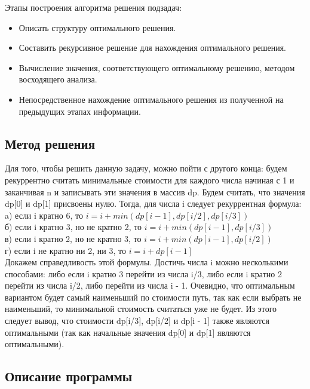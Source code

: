 \documentclass[12pt]{article}
\begin{document}
\noindent Этапы построения алгоритма решения подзадач:
\begin{itemize}
\item  Описать структуру оптимального решения.
\item Составить рекурсивное решение для нахождения оптимального решения.
\item 	Вычисление значения, соответствующего оптимальному решению, методом восходящего анализа.
\item 	Непосредственное нахождение оптимального решения из полученной на предыдущих этапах информации.
	
\end{itemize}

\subsection*{Метод решения}

Для того, чтобы решить данную задачу, можно пойти с другого конца: будем рекуррентно считать минимальные стоимости для каждого числа начиная с 1 и заканчивая n и записывать эти значения в массив dp. Будем считать, что значения dp[0] и dp[1] присвоены нулю. Тогда, для числа i следует рекуррентная формула:\\

a) если i кратно 6, то $i = i + min( dp[ i - 1 ], dp[ i / 2], dp[ i / 3 ] )$ \\

б) если i кратно 3, но не кратно 2, то $i = i + min( dp[ i - 1 ], dp[ i / 3 ] )$\\

в) если i кратно 2, но не кратно 3, то $i = i + min( dp[ i - 1 ], dp[ i / 2 ] )$\\

г) если i не кратно ни 2, ни 3, то $i = i + dp[ i - 1 ]$\\

Докажем справедливость этой формулы. Достичь числа i можно несколькими способами: либо если i кратно 3 перейти из числа i/3, либо если i кратно 2 перейти из числа i/2, либо перейти из числа i - 1. Очевидно, что оптимальным вариантом будет самый наименьший по стоимости путь, так как если выбрать не наименьший, то минимальной стоимость считаться уже не будет. Из этого следует вывод, что стоимости dp[i/3], dp[i/2]  и dp[i - 1] также являются оптимальными (так как начальные значения dp[0] и dp[1] являются оптимальными).

\subsection*{Описание программы}
\end{document}
